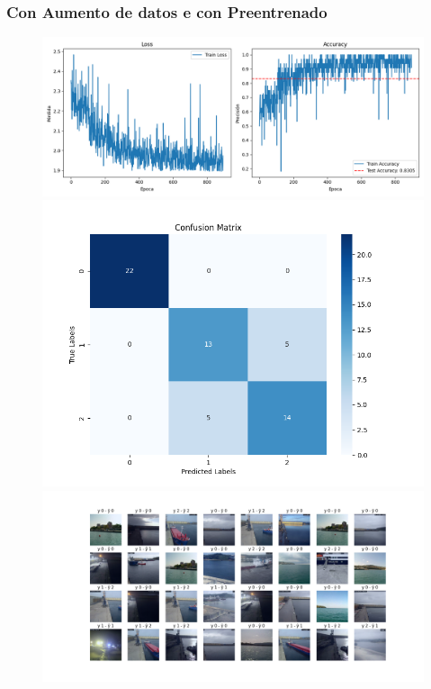\documentclass{article}
\begin{document}
\subsubsection{Con Aumento de datos e con Preentrenado}
\begin{figure}[H]
    \centering
    \begin{minipage}{0.55\textwidth}
        \centering
        \includegraphics[width=\linewidth]{../ultimas_figuras/LOSS__A_True_P_True_D_True_MLP_True_efficientnet_b4.png}
    \end{minipage}
    \begin{minipage}{0.3\textwidth}
        \centering
        \includegraphics[width=\linewidth]{../ultimas_figuras/CM__A_True_P_True_D_True_MLP_True_efficientnet_b4.png}
    \end{minipage}
    \begin{minipage}{0.7\textwidth}
        \centering
        \includegraphics[width=\linewidth]{../ultimas_figuras/GRID__A_True_P_True_D_True_MLP_True_efficientnet_b4.png}
    \end{minipage}
\end{figure}
\end{document}
